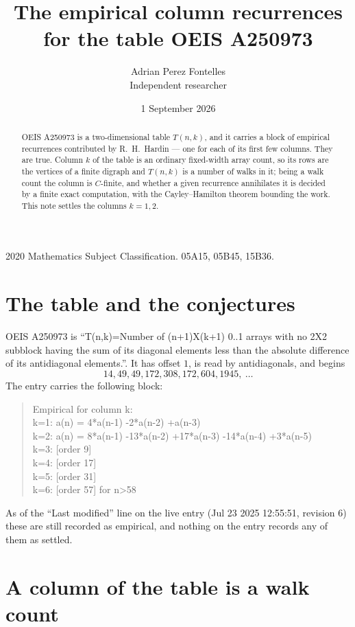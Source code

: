 \documentclass[11pt,a4paper]{article}
\title{The empirical column recurrences for the table OEIS A250973}
\author{Adrian Perez Fontelles\\ \small Independent researcher}
\date{1 September 2026}
\theoremstyle{plain}
\theoremstyle{definition}
\begin{document}
\maketitle

\begin{abstract}
OEIS A250973 is a two-dimensional table $T(n,k)$, and it carries a block of empirical
recurrences contributed by R.~H.~Hardin --- one for each of its first few columns. They are
true. Column $k$ of the table is an ordinary fixed-width array count, so its rows are the
vertices of a finite digraph and $T(n,k)$ is a number of walks in it; being a walk count the
column is $C$-finite, and whether a given recurrence annihilates it is decided by a finite
exact computation, with the Cayley--Hamilton theorem bounding the work. This note settles the
columns $k=1, 2$.
\end{abstract}

\noindent\small 2020 Mathematics Subject Classification. 05A15, 05B45, 15B36.\normalsize

\section{The table and the conjectures}

OEIS A250973 is ``T(n,k)=Number of (n+1)X(k+1) 0..1 arrays with no 2X2 subblock having the sum of its diagonal elements less than the absolute difference of its antidiagonal elements.''. It has offset $1$, is
read by antidiagonals, and begins
\[
14, 49, 49, 172, 308, 172, 604, 1945,\ \dots
\]
The entry carries the following block:
\begin{quote}\small
Empirical for column k:\\
k=1: a(n) = 4*a(n-1) -2*a(n-2) +a(n-3)\\
k=2: a(n) = 8*a(n-1) -13*a(n-2) +17*a(n-3) -14*a(n-4) +3*a(n-5)\\
k=3: [order 9]\\
k=4: [order 17]\\
k=5: [order 31]\\
k=6: [order 57] for n>58\\
\end{quote}
As of the ``Last modified'' line on the live entry (Jul 23 2025 12:55:51, revision 6) these are still
recorded as empirical, and nothing on the entry records any of them as settled.

\section{A column of the table is a walk count}
\end{document}
